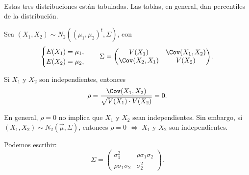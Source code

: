 Estas tres distribuciones están tabuladas.
Las tablas, en general, dan percentiles de la distribución.

\begin{example}
    Sea $(X_1, X_2) \sim N_2((\mu_1, \mu_2)^t, \Sigma)$, con
    $$\begin{cases}
            E(X_1) = \mu_1, \\
            E(X_2) = \mu_2,
        \end{cases} \quad
        \Sigma = \begin{pmatrix}
            V(X_1)         & \Cov(X_1, X_2) \\
            \Cov(X_2, X_1) & V(X_2)
        \end{pmatrix}.$$

    Si $X_1$ y $X_2$ son independientes, entonces
    $$\rho = \frac{\Cov(X_1, X_2)}{\sqrt{V(X_1) \cdot V(X_2)}} = 0.$$

    En general, $\rho = 0$ no implica que $X_1$ y $X_2$ sean independientes.
    Sin embargo, si $(X_1, X_2) \sim N_2(\vec{\mu}, \Sigma)$, entonces $\rho = 0$ $\Leftrightarrow$ $X_1$ y $X_2$ son independientes.

    Podemos escribir:
    $$\Sigma = \begin{pmatrix}
            \sigma_1^2           & \rho\sigma_1\sigma_2 \\
            \rho\sigma_1\sigma_2 & \sigma_2^2
        \end{pmatrix}.$$
\end{example}